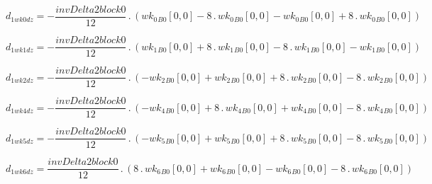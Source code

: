 \documentclass{article}
\begin{document}
\begin{dmath}d_{1 wk0 dz} = - \frac{invDelta2block0}{12} \,.\, \left({wk_{0}{_{B0}}}[{0,0}] - 8 \,.\, {wk_{0}{_{B0}}}[{0,0}] - {wk_{0}{_{B0}}}[{0,0}] + 8 \,.\, {wk_{0}{_{B0}}}[{0,0}]\right)\end{dmath}

\begin{dmath}d_{1 wk1 dz} = - \frac{invDelta2block0}{12} \,.\, \left({wk_{1}{_{B0}}}[{0,0}] + 8 \,.\, {wk_{1}{_{B0}}}[{0,0}] - 8 \,.\, {wk_{1}{_{B0}}}[{0,0}] - {wk_{1}{_{B0}}}[{0,0}]\right)\end{dmath}

\begin{dmath}d_{1 wk2 dz} = - \frac{invDelta2block0}{12} \,.\, \left(- {wk_{2}{_{B0}}}[{0,0}] + {wk_{2}{_{B0}}}[{0,0}] + 8 \,.\, {wk_{2}{_{B0}}}[{0,0}] - 8 \,.\, {wk_{2}{_{B0}}}[{0,0}]\right)\end{dmath}

\begin{dmath}d_{1 wk4 dz} = - \frac{invDelta2block0}{12} \,.\, \left(- {wk_{4}{_{B0}}}[{0,0}] + 8 \,.\, {wk_{4}{_{B0}}}[{0,0}] + {wk_{4}{_{B0}}}[{0,0}] - 8 \,.\, {wk_{4}{_{B0}}}[{0,0}]\right)\end{dmath}

\begin{dmath}d_{1 wk5 dz} = - \frac{invDelta2block0}{12} \,.\, \left(- {wk_{5}{_{B0}}}[{0,0}] + {wk_{5}{_{B0}}}[{0,0}] + 8 \,.\, {wk_{5}{_{B0}}}[{0,0}] - 8 \,.\, {wk_{5}{_{B0}}}[{0,0}]\right)\end{dmath}

\begin{dmath}d_{1 wk6 dz} = \frac{invDelta2block0}{12} \,.\, \left(8 \,.\, {wk_{6}{_{B0}}}[{0,0}] + {wk_{6}{_{B0}}}[{0,0}] - {wk_{6}{_{B0}}}[{0,0}] - 8 \,.\, {wk_{6}{_{B0}}}[{0,0}]\right)\end{dmath}
\end{document}
